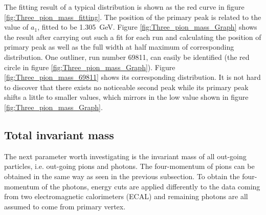 The fitting result of a typical distribution is shown as the red curve in figure \ref{fig:Three_pion_mass_fitting}. The position of the primary peak is related to the value of $a_1$, fitted to be \SI{1.305}{\giga\electronvolt}. Figure \ref{fig:Three_pion_mass_Graph} shows the result after carrying out such a fit for each run and calculating the position of primary peak as well as the full width at half maximum of corresponding distribution. One outliner, run number 69811, can easily be identified (the red circle in figure \ref{fig:Three_pion_mass_Graph}). Figure \ref{fig:Three_pion_mass_69811} shows its corresponding distribution. It is not hard to discover that there exists no noticeable second peak while its primary peak shifts a little to smaller values, which mirrors in the low value shown in figure \ref{fig:Three_pion_mass_Graph}.
\subsection{Total invariant mass}
The next parameter worth investigating is the invariant mass of all out-going particles, i.e. out-going pions and photons. The four-momentum of pions can be obtained in the same way as seen in the previous subsection. To obtain the four-momentum of the photons, energy cuts are applied differently to the data coming from two electromagnetic calorimeters (ECAL) and remaining photons are all assumed to come from primary vertex.
